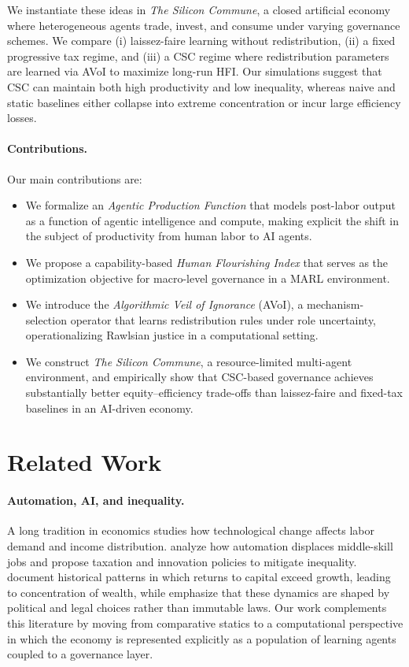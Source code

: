 \documentclass{article}
\begin{document}
We instantiate these ideas in \emph{The Silicon Commune}, a closed artificial economy where heterogeneous agents trade, invest, and consume under varying governance schemes. We compare (i) laissez-faire learning without redistribution, (ii) a fixed progressive tax regime, and (iii) a CSC regime where redistribution parameters are learned via AVoI to maximize long-run HFI. Our simulations suggest that CSC can maintain both high productivity and low inequality, whereas naive and static baselines either collapse into extreme concentration or incur large efficiency losses.

\paragraph{Contributions.}
Our main contributions are:
\begin{itemize}
  \item We formalize an \emph{Agentic Production Function} that models post-labor output as a function of agentic intelligence and compute, making explicit the shift in the subject of productivity from human labor to AI agents.
  \item We propose a capability-based \emph{Human Flourishing Index} that serves as the optimization objective for macro-level governance in a MARL environment.
  \item We introduce the \emph{Algorithmic Veil of Ignorance} (AVoI), a mechanism-selection operator that learns redistribution rules under role uncertainty, operationalizing Rawlsian justice in a computational setting.
  \item We construct \emph{The Silicon Commune}, a resource-limited multi-agent environment, and empirically show that CSC-based governance achieves substantially better equity--efficiency trade-offs than laissez-faire and fixed-tax baselines in an AI-driven economy.
\end{itemize}

\section{Related Work}
\label{sec:related}

\paragraph{Automation, AI, and inequality.}
A long tradition in economics studies how technological change affects labor demand and income distribution. \cite{acemoglu2019automation} analyze how automation displaces middle-skill jobs and propose taxation and innovation policies to mitigate inequality. \cite{piketty2014capital} document historical patterns in which returns to capital exceed growth, leading to concentration of wealth, while \cite{stiglitz2017rewriting} emphasize that these dynamics are shaped by political and legal choices rather than immutable laws. Our work complements this literature by moving from comparative statics to a computational perspective in which the economy is represented explicitly as a population of learning agents coupled to a governance layer.
\end{document}
